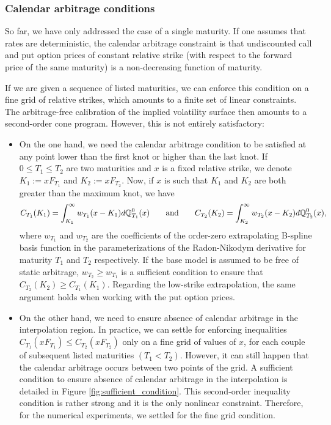 \documentclass[a4paper]{article}
\newcommand{\1}{\textbf{1}}
\newcommand{\Q}{\mathbb{Q}}
\begin{document}
\subsubsection*{Calendar arbitrage conditions}
\par So far, we have only addressed the case of a single maturity. If one assumes that rates are deterministic, the calendar arbitrage constraint is that undiscounted call and put option prices of constant relative strike (with respect to the forward price of the same maturity) is a non-decreasing function of maturity. 
\par If we are given a sequence of listed maturities, we can enforce this condition on a fine grid of relative strikes, which amounts to a finite set of linear constraints. The arbitrage-free calibration of the implied volatility surface then amounts to a second-order cone program. However, this is not entirely satisfactory:
\begin{itemize}
\item On the one hand, we need the calendar arbitrage condition to be satisfied at any point lower than the first knot or higher than the last knot. If $0 \leq T_1 \leq T_2$ are two maturities and $x$ is a fixed relative strike, we denote $K_1 := x F_{T_1}$ and $K_2 := x F_{T_2}$. Now, if $x$ is such that $K_1$ and $K_2$ are both greater than the maximum knot, we have
$$
C_{T_1}(K_1) = \int_{K_1}^\infty w_{T_1} (x - K_1) d\Q^0_{T_1}(x) \qquad \textnormal{and} \qquad C_{T_2}(K_2) = \int_{K_2}^\infty w_{T_2} (x - K_2) d\Q^0_{T_2}(x),
$$
where $w_{T_1}$ and $w_{T_2}$ are the coefficients of the order-zero extrapolating B-spline basis function in the parameterizations of the Radon-Nikodym derivative for maturity $T_1$ and $T_2$ respectively. If the base model is assumed to be free of static arbitrage, $w_{T_2} \geq w_{T_1}$ is a sufficient condition to ensure that $C_{T_2}(K_2) \geq C_{T_1}(K_1)$. Regarding the low-strike extrapolation, the same argument holds when working with the put option prices. 
\item On the other hand, we need to ensure absence of calendar arbitrage in the interpolation region. In practice, we can settle for enforcing inequalities $C_{T_1}(x F_{T_1}) \leq C_{T_2}(x F_{T_2})$ only on a fine grid of values of $x$, for each couple of subsequent listed maturities $(T_1 < T_2)$. However, it can still happen that the calendar arbitrage occurs between two points of the grid. A sufficient condition to ensure absence of calendar arbitrage in the interpolation is detailed in Figure \ref{fig:sufficient_condition}. This second-order inequality condition is rather strong and it is the only nonlinear constraint. Therefore, for the numerical experiments, we settled for the fine grid condition. 
\end{itemize}
\end{document}
